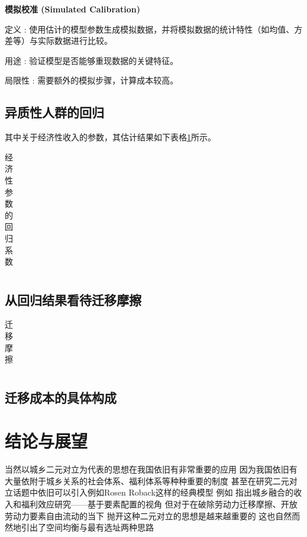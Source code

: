 \documentclass[a4paper,12pt,oneside, fontset=mac]{ctexbook} %
\begin{document}
\textbf{模拟校准 (Simulated Calibration)}

定义 : 使用估计的模型参数生成模拟数据，并将模拟数据的统计特性（如均值、方差等）与实际数据进行比较。

用途 : 验证模型是否能够重现数据的关键特征。

局限性 : 需要额外的模拟步骤，计算成本较高。


\section{异质性人群的回归} 

其中关于经济性收入的参数，其估计结果如下表格\ref{tab:经济性参数的回归系数}所示。
\begin{table}[!ht]
\centering
\caption{经济性参数的回归系数}
\begin{tabularx}{\textwidth}{@{}cXXX@{}}
\toprule
\midrule
\bottomrule
\end{tabularx}
\label{tab:经济性参数的回归系数}
\end{table}


\section{从回归结果看待迁移摩擦}


\begin{table}[!ht]
\centering
\caption{迁移摩擦}
\begin{tabularx}{\textwidth}{@{}cXXX@{}}
\toprule
\midrule
\bottomrule
\end{tabularx}
\label{tab:迁移摩擦}
\end{table}



\section{迁移成本的具体构成}






\chapter{结论与展望}

当然以城乡二元对立为代表的思想在我国依旧有非常重要的应用 因为我国依旧有大量依附于城乡关系的社会体系、福利体系等种种重要的制度
甚至在研究二元对立话题中依旧可以引入例如Rosen Roback这样的经典模型
例如 
\cite{GuoDongMeiChengXiangRongHeDeShouRuHeFuLiXiaoYingYanJiuJiYuYaoSuPeiZhiDeShiJiao2023}指出城乡融合的收入和福利效应研究——基于要素配置的视角
但对于在破除劳动力迁移摩擦、开放劳动力要素自由流动的当下
抛开这种二元对立的思想是越来越重要的
这也自然而然地引出了空间均衡与最有选址两种思路
\end{document}
